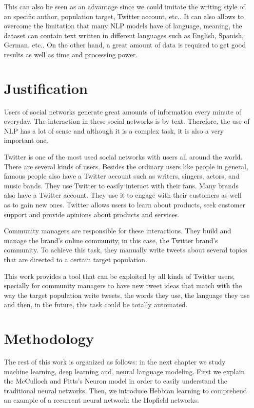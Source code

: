 This can also be seen as an advantage since  we could imitate the writing style of an specific author, population target, Twitter account, etc.. It can also allows to overcome the limitation that many NLP models have of language, meaning, the dataset can contain text written in different languages such as English, Spanish, German, etc.. On the other hand, a great amount of data is required to get good results as well as time and processing power. 

\section{Justification}

Users of  social networks generate great amounts of information every minute of everyday. The interaction in these social networks is by text. Therefore, the use of NLP has a lot of sense and although it is a complex task, it is also a very important one.

Twitter is one of the most used social networks with users all around the world.  There are several kinds of users. Besides the ordinary users like people in general, famous people also have a Twitter account such as writers, singers, actors, and music bands. They use Twitter to easily interact with their fans.  Many brands also have  a Twitter account. They use it to engage with their customers as well as to gain new ones. Twitter allows users to learn about products, seek customer support and provide opinions about products and services.

Community managers are responsible for these interactions. They build and manage the brand's online community, in this case, the Twitter brand's community. To achieve this task, they manually write tweets about several topics that are directed to a certain target population.

This work provides a tool that can be exploited by all kinds of Twitter users, specially for community managers to have new tweet ideas that match with the way the target population write tweets, the words they use, the language they use and then, in the future, this task could be totally automated.

\section{Methodology}
The rest of this work is organized as follows: in the next chapter we study machine learning, deep learning and, neural language modeling. First we explain the McCulloch and Pitts's Neuron model in order to easily understand the traditional neural networks. Then, we introduce Hebbian learning to comprehend an example of a recurrent neural network: the Hopfield networks.

